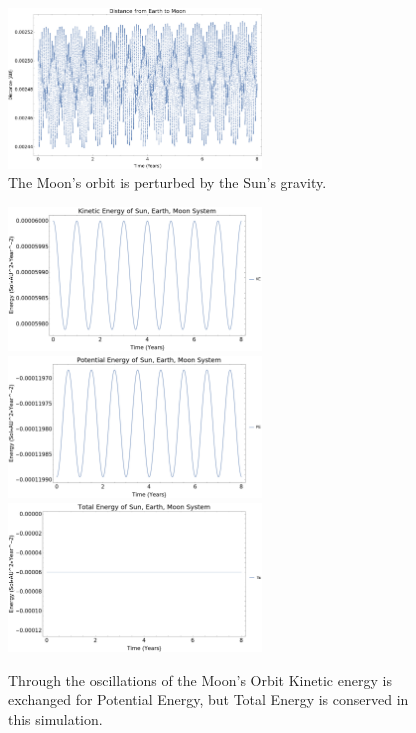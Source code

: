 \documentclass{article}
\begin{document}
\begin{figure}[!htb]
	\begin{center}
		\includegraphics[width=0.6\textwidth]{images/p1-1c.pdf}
	\end{center}
	\caption{The Moon's orbit is perturbed by the Sun's gravity.}
\label{fig:qual}
\end{figure}
\FloatBarrier


\begin{figure}[!htb]
	\begin{center}
		\includegraphics[width=0.6\textwidth]{images/p1-1d.pdf}
		\includegraphics[width=0.6\textwidth]{images/p1-1e.pdf}
		\includegraphics[width=0.6\textwidth]{images/p1-1f.pdf}
	\end{center}
	\caption{Through the oscillations of the Moon's Orbit Kinetic energy is exchanged for Potential Energy, but Total Energy is conserved in this simulation.}
\label{fig:qual}
\end{figure}
\FloatBarrier
\end{document}
